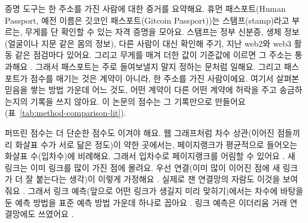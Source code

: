 증명 도구는 한 주소를 가진 사람에 대한 증거를 요약해요. 휴먼 패스포트(Human Passport, 예전 이름은 깃코인 패스포트(Gitcoin Passport))는 스탬프(stamp)라고 부르는, 무게를 단 확인할 수 있는 자격 증명을 모아요. 스탬프는 정부 신분증, 생체 정보(얼굴이나 지문 같은 몸의 정보), 다른 사람이 대신 확인해 주기, 지난 web2와 web3 활동 같은 점검마다 있어요. 그리고 무게를 매겨 더한 값이 기준값에 이르면 그 주소는 통과해요 \parencite{humanpassportnddocs}. 그래서 패스포트는 주로 들여보낼지 말지 정하는 문처럼 일해요. 그리고 패스포트가 점수를 매기는 것은 계약이 아니라, 한 주소를 가진 사람이에요. 여기서 살펴본 믿음을 쌓는 방법 가운데 어느 것도, 어떤 계약이 다른 어떤 계약에 허락을 주고 송금하는지의 기록을 쓰지 않아요. 이 논문의 점수는 그 기록만으로 만들어요(표~\ref{tab:method-comparison-lit}).

퍼뜨린 점수는 더 단순한 점수도 이겨야 해요. 웹 그래프처럼 차수 상관(이어진 점들끼리 화살표 수가 서로 닮은 정도)이 약한 곳에서는, 페이지랭크가 평균적으로 들어오는 화살표 수(입차수)에 비례해요. 그래서 입차수로 페이지랭크를 어림할 수 있어요 \parencite{fortunato2008indegree}. 새 링크는 이미 링크를 많이 가진 점에 몰려요. 우선 연결(이미 많이 이어진 점에 새 링크가 더 잘 붙는다는 생각)이 이렇게 가정해요 \parencite{barabasi1999scaling}. 실제로 잰 연결망의 자람도 이것을 보여 줘요 \parencite{newman2001clustering}. 그래서 링크 예측(앞으로 어떤 링크가 생길지 미리 맞히기)에서는 차수에 바탕을 둔 예측 방법을 표준 예측 방법 가운데 하나로 꼽아요 \parencite{libennowell2007link}. 링크 예측은 이더리움 거래 연결망에도 쓰였어요 \parencite{lin2022tracking}.


